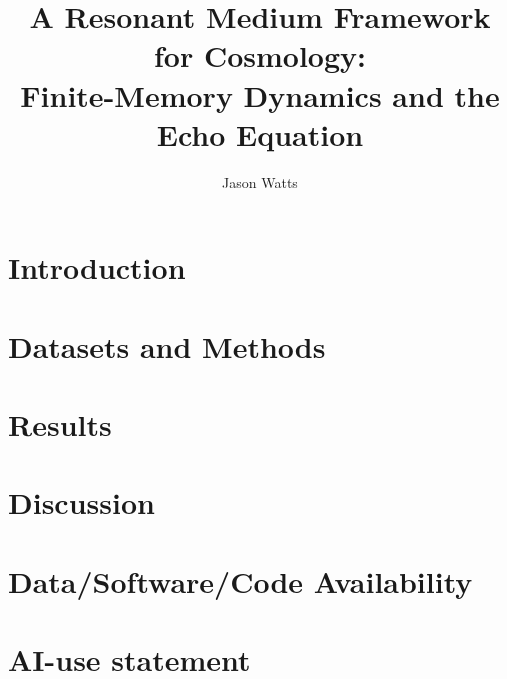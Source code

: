 \documentclass[a4paper,11pt]{article}
\title{A Resonant Medium Framework for Cosmology:\\ Finite-Memory Dynamics and the Echo Equation}
\author{Jason Watts}
\affiliation{Independent Researcher}
\begin{document}

\maketitle
\tableofcontents

\section{Introduction}


\section{Datasets and Methods}


\section{Results}


\section{Discussion}


\section*{Data/Software/Code Availability}


\section*{AI-use statement}


\clearpage
\nocite{Planck2018,PantheonPlus2022,DESI2024_BAO_DR1,Watts2025_EchoEvidence}


\end{document}
